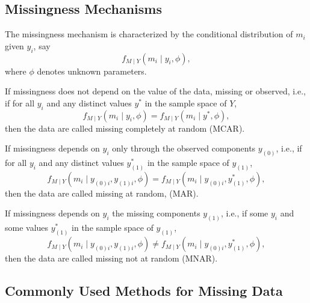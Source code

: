 \subsection{Missingness Mechanisms}

The missingness mechanism is characterized by the conditional distribution of \(m_{i}\) given \(y_{i}\), say
\begin{equation}
	f_{M\mid Y}\left(m_{i}\mid y_{i},\phi\right),
\end{equation}
where \(\phi\) denotes unknown parameters.

\begin{definition}
	If missingness does not depend on the value of the data, missing or observed, i.e., if for all \(y_{i}\) and any distinct values \(y^{*}\) in the sample space of \(Y\),
	\begin{equation}
		f_{M\mid Y}\left(m_{i} \mid y_{i},\phi\right)=f_{M\mid Y}\left(m_{i} \mid y^{*},\phi\right),
	\end{equation}
	then the data are called missing completely at random (MCAR).
\end{definition}

\begin{definition}
	If missingness depends on \(y_{i}\) only through the observed components \(y_{(0)}\), i.e., if for all \(y_{i}\) and any distinct values \(y_{(1)}^{*}\) in the sample space of \(y_{(1)}\),
	\begin{equation}
		f_{M \mid Y}\left(m_{i}\mid y_{(0)i},y_{(1)i},\phi\right)=f_{M\mid Y}\left(m_{i}\mid y_{(0)i},y_{(1)}^{*},\phi\right),
	\end{equation}
	then the data are called missing at random, (MAR).
\end{definition}

\begin{definition}
	If missingness depends on \(y_{i}\) the missing components \(y_{(1)}\), i.e., if some \(y_{i}\) and some values \(y_{(1)}^{*}\) in the sample space of \(y_{(1)}\),
	\begin{equation}
		f_{M \mid Y}\left(m_{i}\mid y_{(0)i},y_{(1)i},\phi\right)\neq f_{M\mid Y}\left(m_{i}\mid y_{(0)i},y_{(1)}^{*},\phi\right),
	\end{equation}
	then the data are called missing not at random (MNAR).
\end{definition}

\subsection{Commonly Used Methods for Missing Data}

